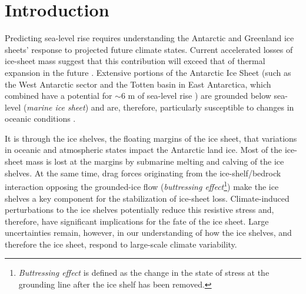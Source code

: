 \section{Introduction}

Predicting sea-level rise requires understanding the Antarctic and Greenland ice sheets' response to projected future climate states. Current accelerated losses of ice-sheet mass suggest that this contribution will exceed that of thermal expansion in the future \parencite{Shepherd2012, Harig2015, Velicogna2009, Sutterley2014}. Extensive portions of the Antarctic Ice Sheet (such as the West Antarctic sector and the Totten basin in East Antarctica, which combined have a potential for $\sim$6 m of sea-level rise \parencite{Fretwell2013}) are grounded below sea-level ({\it marine ice sheet}) and are, therefore, particularly susceptible to changes in oceanic conditions \parencite[e.g.,][]{Joughin2012}.

It is through the ice shelves, the floating margins of the ice sheet, that variations in oceanic and atmospheric states impact the Antarctic land ice. Most of the ice-sheet mass is lost at the margins by submarine melting and calving of the ice shelves. At the same time, drag forces originating from the ice-shelf/bedrock interaction opposing the grounded-ice flow (\emph{buttressing effect}\footnote{\emph{Buttressing effect} is defined as the change in the state of stress at the grounding line after the ice shelf has been removed.}) make the ice shelves a key component for the stabilization of ice-sheet loss. Climate-induced perturbations to the ice shelves potentially reduce this resistive stress and, therefore, have significant implications for the fate of the ice sheet. Large uncertainties remain, however, in our understanding of how the ice shelves, and therefore the ice sheet, respond to large-scale climate variability.

